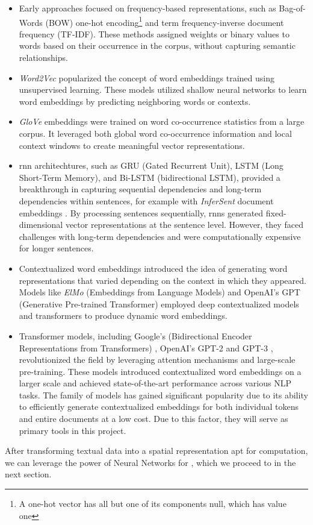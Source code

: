 \begin{itemize}
    \item Early approaches focused on frequency-based representations, such as Bag-of-Words (BOW) one-hot encoding\footnote{A one-hot vector has all but one of its components null, which has value one} and term frequency-inverse document frequency (TF-IDF). These methods assigned weights or binary values to words based on their occurrence in the corpus, without capturing semantic relationships.
    \item \emph{Word2Vec}  popularized the concept of word embeddings trained using unsupervised learning. These models utilized shallow neural networks to learn word embeddings by predicting neighboring words or contexts. 
    \item \emph{GloVe} embeddings   were trained on word co-occurrence statistics from a large corpus. It leveraged both global word co-occurrence information and local context windows to create meaningful vector representations.
    \item \gls{rnn} architechtures, such as GRU (Gated Recurrent Unit), LSTM (Long Short-Term Memory),  and Bi-LSTM (bidirectional LSTM), provided a breakthrough in capturing sequential dependencies and long-term dependencies within sentences, for example with \emph{InferSent} document embeddings . By processing sentences sequentially, \gls{rnn}s generated fixed-dimensional vector representations at the sentence level. However, they faced challenges with long-term dependencies and were computationally expensive for longer sentences.
    
    \item  Contextualized word embeddings introduced the idea of generating word representations that varied depending on the context in which they appeared. Models like \emph{ElMo} (Embeddings from Language Models)  and OpenAI's GPT (Generative Pre-trained Transformer)  employed deep contextualized models and transformers to produce dynamic word embeddings.
    \item Transformer models, including Google's \BERT{} (Bidirectional Encoder Representations from Transformers) , OpenAI's GPT-2  and GPT-3 , revolutionized the field by leveraging attention mechanisms and large-scale pre-training. These models introduced contextualized word embeddings on a larger scale and achieved state-of-the-art performance across various NLP tasks. The \BERT{} family of models has gained significant popularity due to its ability to efficiently generate contextualized embeddings for both individual tokens and entire documents at a low cost. Due to this factor, they will serve as primary tools in this project.
\end{itemize}

After transforming textual data into a spatial representation apt for computation, we can leverage the power of Neural Networks for \textclassification{}, which we proceed to in the next section.
